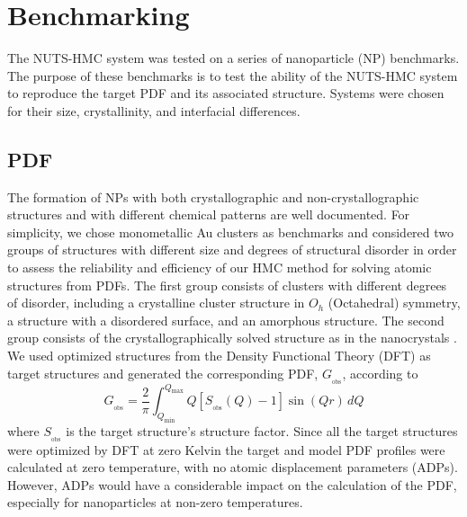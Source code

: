 \graphicspath{{./bmk/figures/}}
\chapter{Benchmarking} \label{ch:bmk}
The NUTS-HMC system was tested on a series of nanoparticle (NP) benchmarks.
The purpose of these benchmarks is to test the ability of the NUTS-HMC system to reproduce the target PDF and its associated structure.
Systems were chosen for their size, crystallinity, and interfacial differences.

\section{PDF}

The formation of NPs with both crystallographic and non-crystallographic structures \cite{Marks1994} and with different chemical patterns \cite{Ferrando2008} are well documented.
For simplicity, we chose monometallic Au clusters as benchmarks and considered two groups of structures with different size and degrees of structural disorder in order to assess the reliability and efficiency of our HMC method for solving atomic structures from PDFs.
The first group consists of  clusters with different degrees of disorder, including a crystalline cluster structure in $O_h$ (Octahedral) symmetry, a structure with a disordered surface, and an amorphous structure.
The second group consists of the crystallographically solved  structure as in the  nanocrystals \cite{Jadzinsky2007,Li2008}.
We used optimized structures from the Density Functional Theory (DFT) as target structures and generated the corresponding PDF, $G_{_\mathrm{obs}}$, according to
\begin{equation}
\label{Eq:Gdef}
  G_{_\mathrm{obs}} = \frac{2}{\pi} \int_{Q_\mathrm{min}}^{Q_\mathrm{max}} Q[S_{_\mathrm{obs}}(Q) - 1] \sin{\left (Q r \right )}\, dQ
\end{equation}
where $S_{_\mathrm{obs}}$ is the target structure's structure factor.
Since all the target structures were optimized by DFT at zero Kelvin the target and model PDF profiles were calculated at zero temperature, with no atomic displacement parameters (ADPs).
However, ADPs would have a considerable impact on the calculation of the PDF, especially for nanoparticles at non-zero temperatures.


